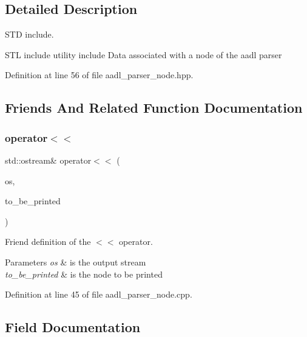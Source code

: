 \subsection{Detailed Description}
S\+TD include. 

S\+TL include utility include Data associated with a node of the aadl parser 

Definition at line 56 of file aadl\+\_\+parser\+\_\+node.\+hpp.



\subsection{Friends And Related Function Documentation}
\mbox{\label{structAadlParserNode_a9c1f3476b5d2061d5220233a54ea4e72}} 
\subsubsection{\texorpdfstring{operator$<$$<$}{operator<<}}
{\footnotesize\ttfamily std\+::ostream\& operator$<$$<$ (\begin{DoxyParamCaption}\item[{std\+::ostream \&}]{os,  }\item[{const \hyperlink{structAadlParserNode}{Aadl\+Parser\+Node} \&}]{to\+\_\+be\+\_\+printed }\end{DoxyParamCaption})\hspace{0.3cm}{\ttfamily [friend]}}



Friend definition of the $<$$<$ operator. 


\begin{DoxyParams}{Parameters}
{\em os} & is the output stream \\
\hline
{\em to\+\_\+be\+\_\+printed} & is the node to be printed \\
\hline
\end{DoxyParams}


Definition at line 45 of file aadl\+\_\+parser\+\_\+node.\+cpp.



\subsection{Field Documentation}
\mbox{\label{structAadlParserNode_a26f18c15d484fef9b2ea0e281a4c9cd0}} 
